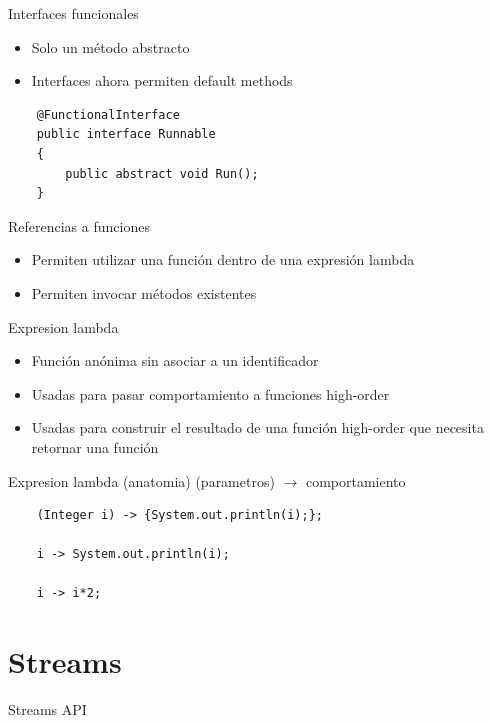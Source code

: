 \documentclass{beamer}
\begin{document}
\begin{frame}[fragile]{Interfaces funcionales}
	\begin{itemize}
	\item Solo un método abstracto
	\item Interfaces ahora permiten default methods
	\end{itemize}
	\begin{lstlisting}
	@FunctionalInterface
	public interface Runnable
	{
		public abstract void Run();
	}
	\end{lstlisting}
\end{frame}

\begin{frame}{Referencias a funciones}
	\begin{itemize}
	\item Permiten utilizar una función dentro de una expresión lambda
	\item Permiten invocar métodos existentes
	\end{itemize}
\end{frame}

\begin{frame}{Expresion lambda}
	\begin{itemize}
	\item Función anónima sin asociar a un identificador
	\item Usadas para pasar comportamiento a funciones high-order
	\item Usadas para construir el resultado de una función high-order que necesita retornar una función
	\end{itemize}
\end{frame}

\begin{frame}[fragile]{Expresion lambda (anatomia)}
	(parametros)  $\to$ {comportamiento}
	
	\begin{lstlisting}
	(Integer i) -> {System.out.println(i);};
		
	i -> System.out.println(i);
	    
	i -> i*2;
	\end{lstlisting}
\end{frame}

\section{Streams}
\begin{frame}
\huge Streams API
\end{frame}
\end{document}
